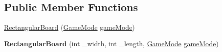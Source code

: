 \subsection*{Public Member Functions}
\begin{DoxyCompactItemize}
\item 
\hyperlink{classmodel_1_1board_1_1_rectangular_board_a9acc529349ad4897e703fd76d86958bc}{Rectangular\-Board} (\hyperlink{interfacemodel_1_1game__modes_1_1_game_mode}{Game\-Mode} \hyperlink{classmodel_1_1board_1_1_board_aeaec4651b92f0416e70eeeaa4959540d}{game\-Mode})
\item 
\hypertarget{classmodel_1_1board_1_1_rectangular_board_ab80e5752c53a80313e2e2ac7372b2022}{{\bfseries Rectangular\-Board} (int \-\_\-width, int \-\_\-length, \hyperlink{interfacemodel_1_1game__modes_1_1_game_mode}{Game\-Mode} \hyperlink{classmodel_1_1board_1_1_board_aeaec4651b92f0416e70eeeaa4959540d}{game\-Mode})}\label{classmodel_1_1board_1_1_rectangular_board_ab80e5752c53a80313e2e2ac7372b2022}


\end{DoxyCompactItemize}

